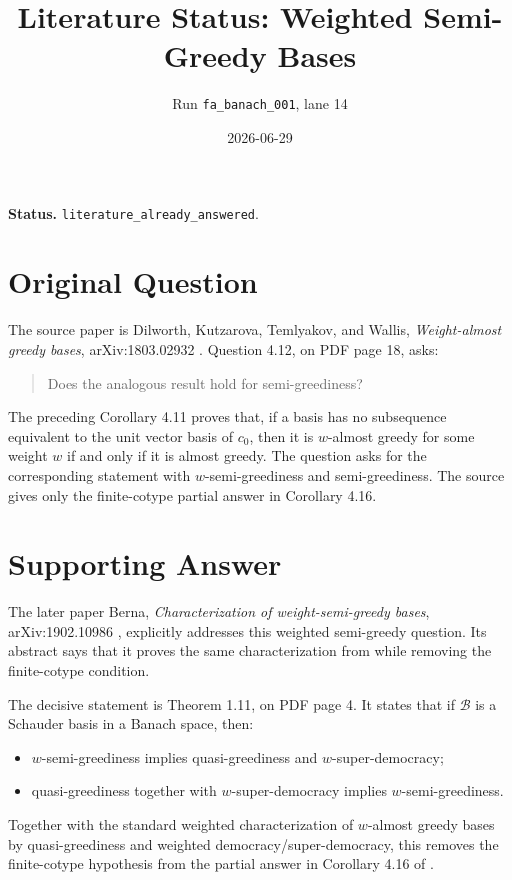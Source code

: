 \documentclass[11pt]{article}
\title{Literature Status: Weighted Semi-Greedy Bases}
\author{Run \texttt{fa\_banach\_001}, lane 14}
\date{2026-06-29}
\begin{document}
\maketitle

\noindent\textbf{Status.} \texttt{literature\_already\_answered}.

\section*{Original Question}

The source paper is Dilworth, Kutzarova, Temlyakov, and Wallis,
\emph{Weight-almost greedy bases}, arXiv:1803.02932 \cite{DKTW}.
Question 4.12, on PDF page 18, asks:
\begin{quote}
Does the analogous result hold for semi-greediness?
\end{quote}
The preceding Corollary 4.11 proves that, if a basis has no subsequence
equivalent to the unit vector basis of \(c_0\), then it is \(w\)-almost greedy
for some weight \(w\) if and only if it is almost greedy. The question asks for
the corresponding statement with \(w\)-semi-greediness and semi-greediness.
The source gives only the finite-cotype partial answer in Corollary 4.16.

\section*{Supporting Answer}

The later paper Berna, \emph{Characterization of weight-semi-greedy bases},
arXiv:1902.10986 \cite{Berna}, explicitly addresses this weighted
semi-greedy question. Its abstract says that it proves the same
characterization from \cite{DKTW} while removing the finite-cotype condition.

The decisive statement is Theorem 1.11, on PDF page 4. It states that if
\(\mathcal B\) is a Schauder basis in a Banach space, then:
\begin{itemize}
\item \(w\)-semi-greediness implies quasi-greediness and
  \(w\)-super-democracy;
\item quasi-greediness together with \(w\)-super-democracy implies
  \(w\)-semi-greediness.
\end{itemize}
Together with the standard weighted characterization of \(w\)-almost greedy
bases by quasi-greediness and weighted democracy/super-democracy, this removes
the finite-cotype hypothesis from the partial answer in Corollary 4.16 of
\cite{DKTW}.
\end{document}
